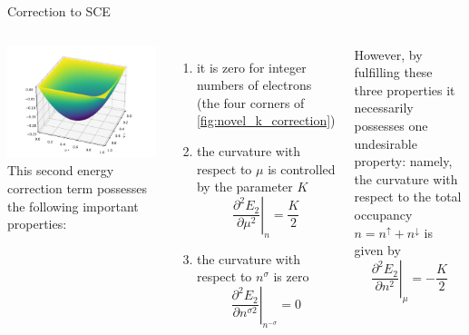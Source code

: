\documentclass[xcolor=table,aspectratio=169]{beamer}
\numberwithin{equation}{section}
\begin{document}
\begin{frame}{Correction to SCE}
    \begin{columns}
        \centering
        \includegraphics[width=1.2\columnwidth]{figures/novel_k_correction.pdf}
        \footnotesize
        This second energy correction term possesses the following important properties:
        \begin{enumerate}
            \item it is zero for integer numbers of electrons (the four corners of \cref{fig:novel_k_correction})
            \item the curvature with respect to $\mu$ is controlled by the parameter $K$
                  \begin{equation}
                      \left.\frac{\partial^2 E_2}{\partial \mu^{2}}\right|_{n} = \frac{K}{2}
                  \end{equation}
            \item the curvature with respect to $n^\sigma$ is zero
                  \begin{equation}
                      \left.\frac{\partial^2 E_2}{\partial n^{\sigma 2}}\right|_{n^{-\sigma}} = 0
                  \end{equation}
        \end{enumerate}
        However, by fulfilling these three properties it necessarily possesses one undesirable property: namely, the curvature with respect to the total occupancy $n = n^\uparrow + n^\downarrow$ is given by
        \begin{equation}
            \left.\frac{\partial^2 E_2}{\partial n^{2}}\right|_{\mu} = -\frac{K}{2}
        \end{equation}
    \end{columns}
\end{frame}
\end{document}
